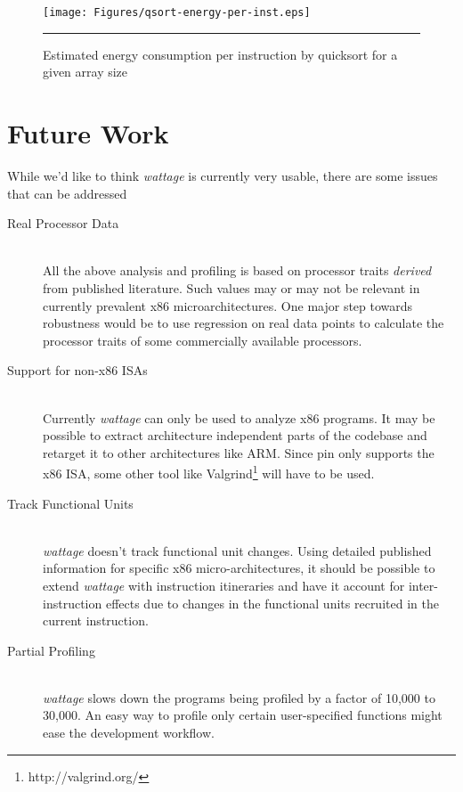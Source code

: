 \begin{figure}[htbp]
  \centering
  \texttt{[image: Figures/qsort-energy-per-inst.eps]}
  \rule{35em}{0.5pt}
  \caption{Estimated energy consumption per instruction by quicksort
    for a given array size}
  \label{fig:qsort-energy-per-inst-per-array-length}
\end{figure}

\section{Future Work}

While we'd like to think \textit{wattage} is currently very usable,
there are some issues that can be addressed

\begin{description}
  \item[Real Processor Data] \hfill \\ All the above analysis and
    profiling is based on processor traits \textit{derived} from
    published literature.  Such values may or may not be relevant in
    currently prevalent x86 microarchitectures.  One major step
    towards robustness would be to use regression on real data points
    to calculate the processor traits of some commercially available
    processors.

  \item[Support for non-x86 ISAs] \hfill \\ Currently \textit{wattage}
    can only be used to analyze x86 programs.  It may be possible to
    extract architecture independent parts of the codebase and
    retarget it to other architectures like ARM.  Since pin only
    supports the x86 ISA, some other tool like
    Valgrind\footnote{http://valgrind.org/} will have to be used.

  \item[Track Functional Units] \hfill \\ \textit{wattage} doesn't
    track functional unit changes.  Using detailed published
    information for specific x86 micro-architectures, it should be
    possible to extend \textit{wattage} with instruction itineraries
    and have it account for inter-instruction effects due to changes
    in the functional units recruited in the current instruction.

  \item[Partial Profiling] \hfill \\ \textit{wattage} slows down the
    programs being profiled by a factor of 10,000 to 30,000.  An easy
    way to profile only certain user-specified functions might ease
    the development workflow.
\end{description}
